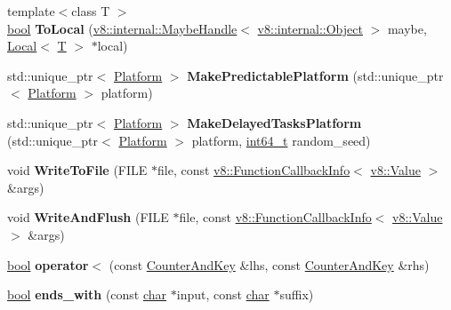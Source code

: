 \begin{DoxyCompactItemize}
{\footnotesize template$<$class T $>$ }\\\mbox{\hyperlink{classbool}{bool}} {\bfseries To\+Local} (\mbox{\hyperlink{classv8_1_1internal_1_1MaybeHandle}{v8\+::internal\+::\+Maybe\+Handle}}$<$ \mbox{\hyperlink{classv8_1_1internal_1_1Object}{v8\+::internal\+::\+Object}} $>$ maybe, \mbox{\hyperlink{classv8_1_1Local}{Local}}$<$ \mbox{\hyperlink{classv8_1_1internal_1_1torque_1_1T}{T}} $>$ $\ast$local)
\item 
\mbox{\label{namespacev8_a89567c5b2a338ced32e39e8a85191b5b}} 
std\+::unique\+\_\+ptr$<$ \mbox{\hyperlink{classv8_1_1Platform}{Platform}} $>$ {\bfseries Make\+Predictable\+Platform} (std\+::unique\+\_\+ptr$<$ \mbox{\hyperlink{classv8_1_1Platform}{Platform}} $>$ platform)
\item 
\mbox{\label{namespacev8_ac87ab353f197393b9c3cbe83d662ff97}} 
std\+::unique\+\_\+ptr$<$ \mbox{\hyperlink{classv8_1_1Platform}{Platform}} $>$ {\bfseries Make\+Delayed\+Tasks\+Platform} (std\+::unique\+\_\+ptr$<$ \mbox{\hyperlink{classv8_1_1Platform}{Platform}} $>$ platform, \mbox{\hyperlink{classint64__t}{int64\+\_\+t}} random\+\_\+seed)
\item 
\mbox{\label{namespacev8_a6980420a5f40ebbc4ea4409e181ab76c}} 
void {\bfseries Write\+To\+File} (F\+I\+LE $\ast$file, const \mbox{\hyperlink{classv8_1_1FunctionCallbackInfo}{v8\+::\+Function\+Callback\+Info}}$<$ \mbox{\hyperlink{classv8_1_1Value}{v8\+::\+Value}} $>$ \&args)
\item 
\mbox{\label{namespacev8_ac9e25fdabb72ec5e72ad208a3d842dad}} 
void {\bfseries Write\+And\+Flush} (F\+I\+LE $\ast$file, const \mbox{\hyperlink{classv8_1_1FunctionCallbackInfo}{v8\+::\+Function\+Callback\+Info}}$<$ \mbox{\hyperlink{classv8_1_1Value}{v8\+::\+Value}} $>$ \&args)
\item 
\mbox{\label{namespacev8_a40f565d5ff2945b209a8beff63401e51}} 
\mbox{\hyperlink{classbool}{bool}} {\bfseries operator$<$} (const \mbox{\hyperlink{structv8_1_1CounterAndKey}{Counter\+And\+Key}} \&lhs, const \mbox{\hyperlink{structv8_1_1CounterAndKey}{Counter\+And\+Key}} \&rhs)
\item 
\mbox{\label{namespacev8_a2baa5273ccac96a5dafbc49c0164a882}} 
\mbox{\hyperlink{classbool}{bool}} {\bfseries ends\+\_\+with} (const \mbox{\hyperlink{classchar}{char}} $\ast$input, const \mbox{\hyperlink{classchar}{char}} $\ast$suffix)
\end{DoxyCompactItemize}
